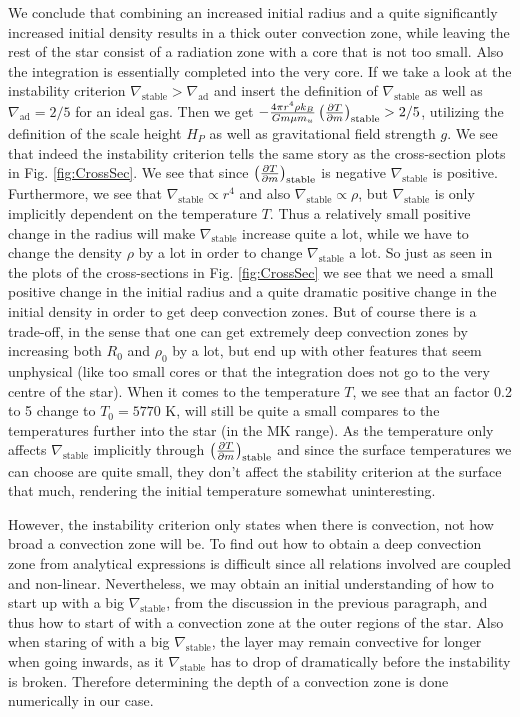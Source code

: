 \documentclass{emulateapj}
\begin{document}
	We conclude that combining an increased initial radius and a quite significantly increased initial density results in a thick outer convection zone, while leaving the rest of the star consist of a radiation zone with a core that is not too small. Also the integration is essentially completed into the very core. If we take a look at the instability criterion $\nabla_\text{stable}>\nabla_\text{ad}$ and insert the definition of $\nabla_\text{stable}$ as well as $\nabla_\text{ad}= 2/5$ for an ideal gas. Then we get $-\frac{4\pi r^4 \rho k_B}{Gm\mu m_u}\left(\pdv{T}{m}\right)_\text{stable} > 2/5$, utilizing the definition of the scale height $H_P$ as well as gravitational field strength $g$. We see that indeed the instability criterion tells the same story as the cross-section plots in Fig. \ref{fig:CrossSec}. We see that since $\left(\pdv{T}{m}\right)_\text{stable}$ is negative $\nabla_\text{stable}$ is positive. Furthermore, we see that $\nabla_\text{stable}\propto r^4$ and also $\nabla_\text{stable}\propto\rho$, but $\nabla_\text{stable}$ is only implicitly dependent on the temperature $T$. Thus a relatively small positive change in the radius will make $\nabla_\text{stable}$ increase quite a lot, while we have to change the density $\rho$ by a lot in order to change $\nabla_\text{stable}$ a lot. So just as seen in the plots of the cross-sections in Fig. \ref{fig:CrossSec} we see that we need a small positive change in the initial radius and a quite dramatic positive change in the initial density in order to get deep convection zones. But of course there is a trade-off, in the sense that one can get extremely deep convection zones by increasing both $R_0$ and $\rho_0$ by a lot, but end up with other features that seem unphysical (like too small cores or that the integration does not go to the very centre of the star). When it comes to the temperature $T$, we see that an factor 0.2 to 5 change to $T_0 = 5770$ K, will still be quite a small compares to the temperatures further into the star (in the MK range). As the temperature only affects $\nabla_\text{stable}$ implicitly through $\left(\pdv{T}{m}\right)_\text{stable}$ and since the surface temperatures we can choose are quite small, they don't affect the stability criterion at the surface that much, rendering the initial temperature somewhat uninteresting.
	
	However, the instability criterion only states when there is convection, not how broad a convection zone will be. To find out how to obtain a deep convection zone from analytical expressions is difficult since all relations involved are coupled and non-linear. Nevertheless, we may obtain an initial understanding of how to start up with a big $\nabla_\text{stable}$, from the discussion in the previous paragraph, and thus how to start of with a convection zone at the outer regions of the star. Also when staring of with a big $\nabla_\text{stable}$, the layer may remain convective for longer when going inwards, as it $\nabla_\text{stable}$ has to drop of dramatically before the instability is broken. Therefore determining the depth of a convection zone is done numerically in our case.
	
\end{document}

